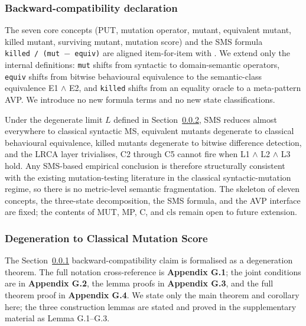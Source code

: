 \documentclass[manuscript,screen,review]{acmart}
\begin{document}
\subsubsection{Backward-compatibility declaration}\label{backward-compatibility-declaration}

The seven core concepts (PUT, mutation operator, mutant, equivalent
mutant, killed mutant, surviving mutant, mutation score) and the SMS
formula
\texttt{\textbar{}killed\textbar{}\ /\ (\textbar{}mut\textbar{}\ $-$\ \textbar{}equiv\textbar{})}
are aligned item-for-item with \citet{d7c38286734419b52de4262c9802ebdfcf4b9447}. We extend only the
internal definitions: \texttt{mut} shifts from syntactic to
domain-semantic operators, \texttt{equiv} shifts from bitwise
behavioural equivalence to the semantic-class equivalence E1 $\wedge$ E2, and
\texttt{killed} shifts from an equality oracle to a meta-pattern AVP. We
introduce no new formula terms and no new state classifications.

Under the degenerate limit $L$ defined in Section~\ref{sms-ms-degeneration-formal-statement}, SMS reduces
almost everywhere to classical syntactic MS, equivalent mutants
degenerate to classical behavioural equivalence, killed mutants
degenerate to bitwise difference detection, and the LRCA layer
trivialises, C2 through C5 cannot fire when L1 $\wedge$ L2 $\wedge$ L3 hold. Any
SMS-based empirical conclusion is therefore structurally consistent with
the existing mutation-testing literature in the classical
syntactic-mutation regime, so there is no metric-level semantic
fragmentation. The skeleton of eleven concepts, the three-state
decomposition, the SMS formula, and the AVP interface are fixed; the
contents of MUT, MP, C, and $\mathrm{cls}$ remain open to future
extension.

\subsubsection{Degeneration to Classical Mutation Score}\label{sms-ms-degeneration-formal-statement}

The Section~\ref{backward-compatibility-declaration} backward-compatibility claim is formalised as a degeneration
theorem. The full notation cross-reference is \textbf{Appendix G.1}; the joint
conditions are in \textbf{Appendix G.2}, the lemma proofs in
\textbf{Appendix G.3}, and the full theorem proof in \textbf{Appendix G.4}. We
state only the main theorem and corollary here; the three construction
lemmas are stated and proved in the supplementary material as
Lemma G.1--G.3.
\end{document}
